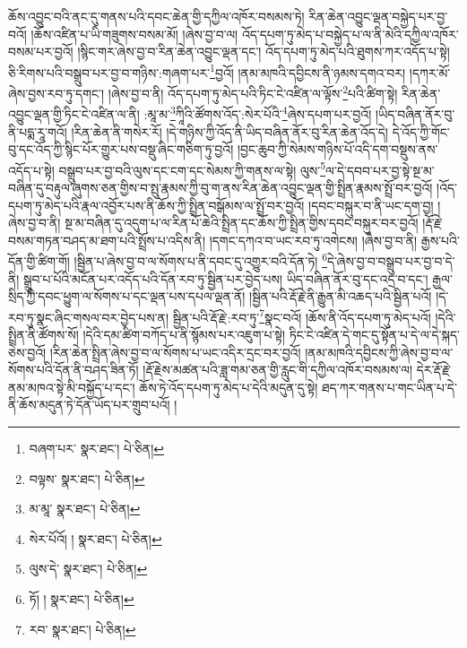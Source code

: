 ཆོས་འབྱུང་བའི་ནང་དུ་གནས་པའི་དབང་ཆེན་གྱི་དཀྱིལ་འཁོར་བསམས་ཏེ། རིན་ཆེན་འབྱུང་ལྡན་བསྐྱེད་པར་བྱ་བའོ། །ཆོས་འཛིན་པ་ཡི་གཟུགས་བསམ་མོ། །ཞེས་བྱ་བ་ལ། འོད་དཔག་ཏུ་མེད་པ་བསྐྱེད་པ་ལ་ནི་མེའི་དཀྱིལ་འཁོར་བསམ་པར་བྱའོ། །སྙིང་གར་ཞེས་བྱ་བ་རིན་ཆེན་འབྱུང་ལྡན་དང་། འོད་དཔག་ཏུ་མེད་པའི་ཐུགས་ཀར་འདོད་པ་སྟེ། ཅི་རིགས་པའི་བསྒྲུབ་པར་བྱ་བ་གཉིས་:གཞག་པར་\footnote{བཞག་པར་  སྣར་ཐང་།  པེ་ཅིན། }བྱའོ། །ནམ་མཁའི་དབྱིངས་ནི་ཉམས་དགའ་བར། །དཀར་མོ་ཞེས་བྱས་རབ་ཏུ་དགང་། །ཞེས་བྱ་བ་ནི། འོད་དཔག་ཏུ་མེད་པའི་ཏིང་ངེ་འཛིན་ལ་ལྟོས་\footnote{བལྟས་  སྣར་ཐང་།  པེ་ཅིན། }པའི་ཚིག་སྟེ། རིན་ཆེན་འབྱུང་ལྡན་གྱི་ཏིང་ངེ་འཛིན་ལ་ནི། :མཱ་མ་\footnote{མ་མཱ་  སྣར་ཐང་།  པེ་ཅིན། }ཀཱིའི་ཚོགས་འོད་:སེར་པོའི་\footnote{སེར་པོའོ། །  སྣར་ཐང་།  པེ་ཅིན། }ཞེས་དཔག་པར་བྱའོ། །ཡིད་བཞིན་ནོར་བུ་ནི་པདྨ་རཱ་གའོ། །རིན་ཆེན་ནི་གསེར་རོ། །དེ་གཉིས་ཀྱི་འོད་ནི་ཡིད་བཞིན་ནོར་བུ་རིན་ཆེན་འོད་དེ། དེ་འོད་ཀྱི་གོང་བུ་དང་འོད་ཀྱི་སྙིང་པོར་གྱུར་པས་བསྡུ་ཞིང་གཅིག་ཏུ་བྱའོ། །བྱང་ཆུབ་ཀྱི་སེམས་གཉིས་པོ་འདི་དག་བསྡུས་ནས་འདོད་པ་སྟེ། བསྒྲུབ་པར་བྱ་བའི་ལུས་དང་ངག་དང་སེམས་ཀྱི་གནས་ལ་སྟེ། ལུས་\footnote{ལུས་དེ་  སྣར་ཐང་།  པེ་ཅིན། }ལ་དེ་དབབ་པར་བྱ་སྟེ་སྔ་མ་བཞིན་དུ་བརྟུལ་ཞུགས་ཅན་གྱིས་བ་སྤུ་རྣམས་ཀྱི་བུ་ག་ནས་རིན་ཆེན་འབྱུང་ལྡན་གྱི་སྤྲིན་རྣམས་སྤྲོ་བར་བྱའོ། །འོད་དཔག་ཏུ་མེད་པའི་རྣལ་འབྱོར་པས་ནི་ཆོས་ཀྱི་སྤྲིན་བསྒོམས་ལ་སྤྲོ་བར་བྱའོ། །དབང་བསྐུར་བ་ནི་ཡང་དག་བྱ། །ཞེས་བྱ་བ་ནི། སྔ་མ་བཞིན་དུ་འདུག་པ་ལ་རིན་པོ་ཆེའི་སྤྲིན་དང་ཆོས་ཀྱི་སྤྲིན་གྱིས་དབང་བསྐུར་བར་བྱའོ། །རྡོ་རྗེ་བསམ་གཏན་བཤད་མ་ཐག་པའི་སྤྲོས་པ་འདིས་ནི། །དགང་དཀའ་བ་ཡང་རབ་ཏུ་འགེངས། །ཞེས་བྱ་བ་ནི། རྒྱས་པའི་དོན་གྱི་ཚིག་གོ། །སྦྱིན་པ་ཞེས་བྱ་བ་ལ་སོགས་པ་ནི་དབང་དུ་འགྱུར་བའི་དོན་ཏེ། \footnote{ཏོ། །   སྣར་ཐང་།  པེ་ཅིན། }དེ་ཞེས་བྱ་བ་བསྒྲུབ་པར་བྱ་བ་དེ་ནི། སྒྲུབ་པ་པོའི་མངོན་པར་འདོད་པའི་དོན་རབ་ཏུ་སྦྱིན་པར་བྱེད་པས། ཡིད་བཞིན་ནོར་བུ་དང་འདྲ་བ་དང་། རྒྱལ་སྲིད་ཀྱི་དབང་ཕྱུག་ལ་སོགས་པ་དང་ལྡན་པས་དཔལ་ལྡན་ནོ། །སྦྱིན་པའི་རྡོ་རྗེ་ནི་རྒྱུན་མི་འཆད་པའི་སྦྱིན་པའོ། །དེ་རབ་ཏུ་སྣང་ཞིང་གསལ་བར་བྱེད་པས་ན། སྦྱིན་པའི་རྡོ་རྗེ་:རབ་ཏུ་\footnote{རབ་  སྣར་ཐང་།  པེ་ཅིན། }སྣང་བའོ། །ཆོས་ནི་འོད་དཔག་ཏུ་མེད་པའོ། །དེའི་སྤྲིན་ནི་ཚོགས་སོ། །དེའི་དམ་ཚིག་བཀོད་པ་ནི་སྙོམས་པར་འཇུག་པ་སྟེ། ཏིང་ངེ་འཛིན་དེ་གང་དུ་སྟོན་པ་དེ་ལ་དེ་སྐད་ཅེས་བྱའོ། །རིན་ཆེན་སྤྲིན་ཞེས་བྱ་བ་ལ་སོགས་པ་ཡང་འདིར་དྲང་བར་བྱའོ། །ནམ་མཁའི་དབྱིངས་ཀྱི་ཞེས་བྱ་བ་ལ་སོགས་པའི་དོན་ནི་བཤད་ཟིན་ཏོ། །རྡོ་རྗེས་མཚན་པའི་ཟླ་གམ་ཅན་གྱི་རླུང་གི་དཀྱིལ་འཁོར་བསམས་ལ། དེར་རྡོ་རྗེ་ནམ་མཁའ་སྟེ་མི་བསྐྱོད་པ་དང་། ཆོས་ཏེ་འོད་དཔག་ཏུ་མེད་པ་དེའི་མདུན་དུ་སྟེ། ཐད་ཀར་གནས་པ་གང་ཡིན་པ་དེ་ནི་ཆོས་མདུན་ཏེ་དོན་ཡོད་པར་གྲུབ་པའོ། །
